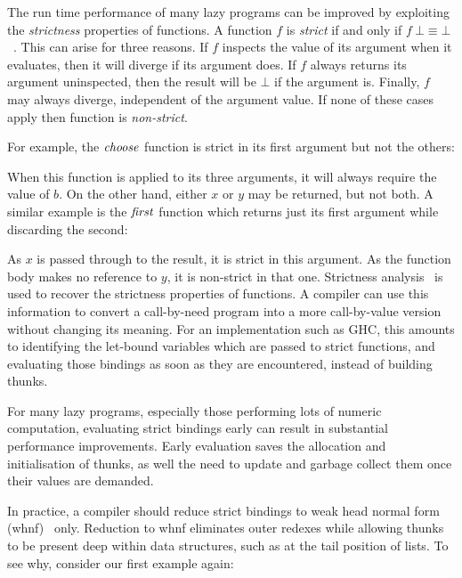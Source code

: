 The run time performance of many lazy programs can be improved by exploiting the \emph{strictness} properties of functions. A function $f$ is \emph{strict} if and only if $f \ \bot \equiv \bot$~\cite{peyton-jones:implementation}. This can arise for three reasons. If $f$ inspects the value of its argument when it evaluates, then it will diverge if its argument does. If $f$ always returns its argument uninspected, then the result will be $\bot$ if the argument is. Finally, $f$ may always diverge, independent of the argument value. If none of these cases apply then function is \emph{non-strict}.

For example, the $\operatorname{\mathit{choose}}$ function is strict in its first argument but not the others:


When this function is applied to its three arguments, it will always require the value of $b$. On the other hand, either $x$ or $y$ may be returned, but not both. A similar example is the $\operatorname{\mathit{first}}$ function which returns just its first argument while discarding the second:


As $x$ is passed through to the result, it is strict in this argument. As the function body makes no reference to $y$, it is non-strict in that one. Strictness analysis~\cite{burn:strictness, wadler:projections-strictness, sekar:fast-strictness} is used to recover the strictness properties of functions. A compiler can use this information to convert a call-by-need program into a more call-by-value version without changing its meaning. For an implementation such as GHC, this amounts to identifying the let-bound variables which are passed to strict functions, and evaluating those bindings as soon as they are encountered, instead of building thunks. 

For many lazy programs, especially those performing lots of numeric computation, evaluating strict bindings early can result in substantial performance improvements. Early evaluation saves the allocation and initialisation of thunks, as well the need to update and garbage collect them once their values are demanded.

In practice, a compiler should reduce strict bindings to weak head normal form (whnf)~\cite{peyton-jones:implementation} only. Reduction to whnf eliminates outer redexes while allowing thunks to be present deep within data structures, such as at the tail position of lists. To see why, consider our first example again:

